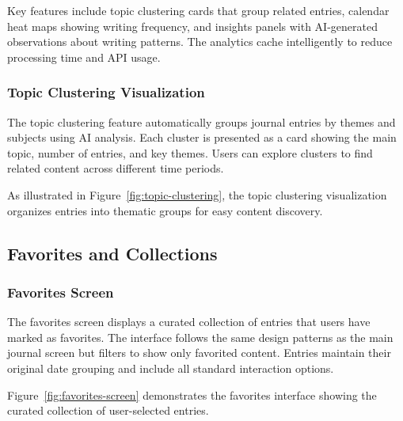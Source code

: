 Key features include topic clustering cards that group related entries, calendar heat maps showing writing frequency, and insights panels with AI-generated observations about writing patterns. The analytics cache intelligently to reduce processing time and API usage.

\subsubsection{Topic Clustering Visualization}

The topic clustering feature automatically groups journal entries by themes and subjects using AI analysis. Each cluster is presented as a card showing the main topic, number of entries, and key themes. Users can explore clusters to find related content across different time periods.

As illustrated in Figure~\ref{fig:topic-clustering}, the topic clustering visualization organizes entries into thematic groups for easy content discovery.


\subsection{Favorites and Collections}

\subsubsection{Favorites Screen}

The favorites screen displays a curated collection of entries that users have marked as favorites. The interface follows the same design patterns as the main journal screen but filters to show only favorited content. Entries maintain their original date grouping and include all standard interaction options.

Figure~\ref{fig:favorites-screen} demonstrates the favorites interface showing the curated collection of user-selected entries.


